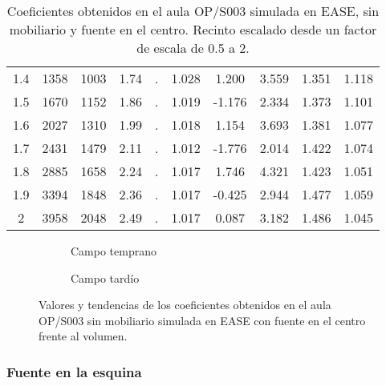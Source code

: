\begin{table}[ht]
{\begin{tabular}{@{}cccccccccc@{}}
1.4 & 1358 & 1003 & 1.74 & . & 1.028 & 1.200 & 3.559 & 1.351 & 1.118 \\
1.5 & 1670 & 1152 & 1.86 & . & 1.019 & -1.176 & 2.334 & 1.373 & 1.101 \\
1.6 & 2027 & 1310 & 1.99 & . & 1.018 & 1.154 & 3.693 & 1.381 & 1.077 \\
1.7 & 2431 & 1479 & 2.11 & . & 1.012 & -1.776 & 2.014 & 1.422 & 1.074 \\
1.8 & 2885 & 1658 & 2.24 & . & 1.017 & 1.746 & 4.321 & 1.423 & 1.051 \\
1.9 & 3394 & 1848 & 2.36 & . & 1.017 & -0.425 & 2.944 & 1.477 & 1.059 \\
2 & 3958 & 2048 & 2.49 & . & 1.017 & 0.087 & 3.182 & 1.486 & 1.045 \\ \bottomrule
\end{tabular}
}
\caption{Coeficientes obtenidos en el aula OP/S003 simulada en EASE, sin mobiliario y fuente en el centro. Recinto escalado desde un factor de escala de 0.5 a 2.}
\label{coef:opcentro}
\end{table}
\FloatBarrier

\begin{figure}[H]
    \begin{subfigure}[b]{0.4\textwidth}
    	\centering%
         {%
    }
    \caption{Campo temprano}%
    \end{subfigure}%
    \hspace{1.65cm}%
    \begin{subfigure}[b]{0.4\textwidth}%
    	\centering%
        {%
    }
    \caption{Campo tardío}%
    \end{subfigure}
    \caption{Valores y tendencias de los coeficientes obtenidos en el aula OP/S003 sin mobiliario simulada en EASE con fuente en el centro frente al volumen.}
\label{graf:coefopearlylatecentro}%
\end{figure}

\subsubsection{Fuente en la esquina}

